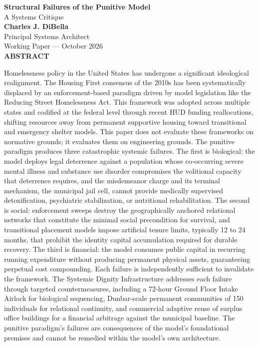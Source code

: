 \documentclass[12pt, letterpaper]{article}
\begin{document}
\begin{titlepage}
\begin{center}
{\LARGE \textbf{Structural Failures of the Punitive Model}}\\[6pt]
{\large A Systems Critique}\\[1.0cm]
{\normalsize \textbf{Charles J. DiBella}}\\[0.01cm]
{\normalsize Principal Systems Architect}\\[0.01cm]
{\normalsize Working Paper --- October 2026}\\[0.5cm]
\textbf{ABSTRACT}
\vspace{0.5cm}
\end{center}
\begin{minipage}{0.95\textwidth}
\noindent

Homelessness policy in the United States has undergone a significant ideological realignment. The Housing First consensus of the 2010s has been systematically displaced by an enforcement-based paradigm driven by model legislation like the Reducing Street Homelessness Act. This framework was adopted across multiple states and codified at the federal level through recent HUD funding reallocations, shifting resources away from permanent supportive housing toward transitional and emergency shelter models. This paper does not evaluate these frameworks on normative grounds; it evaluates them on engineering grounds. The punitive paradigm produces three catastrophic systemic failures. The first is biological: the model deploys legal deterrence against a population whose co-occurring severe mental illness and substance use disorder compromises the volitional capacity that deterrence requires, and the misdemeanor charge and its terminal mechanism, the municipal jail cell, cannot provide medically supervised detoxification, psychiatric stabilization, or nutritional rehabilitation. The second is social: enforcement sweeps destroy the geographically anchored relational networks that constitute the minimal social precondition for survival, and transitional placement models impose artificial tenure limits, typically 12 to 24 months, that prohibit the identity capital accumulation required for durable recovery. The third is financial: the model consumes public capital in recurring running expenditure without producing permanent physical assets, guaranteeing perpetual cost compounding. Each failure is independently sufficient to invalidate the framework. The Systemic Dignity Infrastructure addresses each failure through targeted countermeasures, including a 72-hour Ground Floor Intake Airlock for biological sequencing, Dunbar-scale permanent communities of 150 individuals for relational continuity, and commercial adaptive reuse of surplus office buildings for a financial arbitrage against the municipal baseline. The punitive paradigm's failures are consequences of the model's foundational premises and cannot be remedied within the model's own architecture.

\end{minipage}
\end{titlepage}
\end{document}
